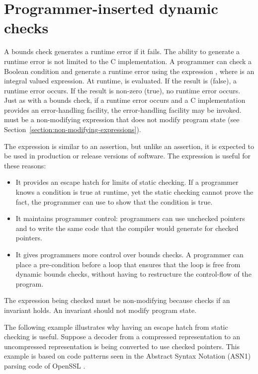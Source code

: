 \section{Programmer-inserted dynamic checks}
\label{section:programmer-dynamic-checks}

A bounds check generates a runtime error if it fails. The ability to
generate a runtime error is not limited to the C implementation. A
programmer can check a Boolean condition and generate a runtime error
using the expression \code{)}, where
 is an integral valued expression. At runtime,  is
evaluated. If the result is  (false), a runtime error occurs.
If the result is non-zero (true), no runtime error occurs. Just as with
a bounds check, if a runtime error occurs and a C implementation
provides an error-handling facility, the error-handling facility may be
invoked.   must be a non-modifying expression that does not modify
program state (see Section~\ref{section:non-modifying-expressions}).

The  expression is similar to an assertion, but
unlike an assertion, it is expected to be used in production or release
versions of software. The  expression is useful
for these reasons:

\begin{itemize}
\item
  It provides an escape hatch for limits of static checking. If a
  programmer knows a condition is true at runtime, yet the static
  checking cannot prove the fact, the programmer can use
   to show that the condition is true.
\item
  It maintains programmer control: programmers can use unchecked pointers
  and  to write the same code that the compiler
  would generate for checked pointers.
\item
  It gives programmers more control over bounds checks. A programmer can
  place a pre-condition before a loop that ensures that the loop is free
  from dynamic bounds checks, without having to restructure the
  control-flow of the program.
\end{itemize}

The expression being checked must be non-modifying because
 checks if an invariant holds.  An invariant
should not modify program state.

The following example illustrates why having an escape hatch from static
checking is useful. Suppose a decoder from a compressed representation
to an uncompressed representation is being converted to use checked
pointers. This example is based on code patterns seen in the Abstract
Syntax Notation (ASN1) parsing code of OpenSSL \cite{OpenSSL2015}.


